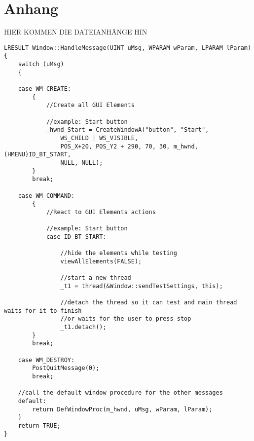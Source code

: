 

\chapter{Anhang}
HIER KOMMEN DIE DATEIANHÄNGE HIN



\begin{lstlisting}	
LRESULT Window::HandleMessage(UINT uMsg, WPARAM wParam, LPARAM lParam)
{
    switch (uMsg)
    {

    case WM_CREATE:
        {
            //Create all GUI Elements
            
            //example: Start button
            _hwnd_Start = CreateWindowA("button", "Start",
				WS_CHILD | WS_VISIBLE,
				POS_X+20, POS_Y2 + 290, 70, 30, m_hwnd, (HMENU)ID_BT_START,
				NULL, NULL);
        }
        break;
        
    case WM_COMMAND:
        {
            //React to GUI Elements actions
            
            //example: Start button
            case ID_BT_START:

				//hide the elements while testing
				viewAllElements(FALSE);

				//start a new thread
				_t1 = thread(&Window::sendTestSettings, this);
				
				//detach the thread so it can test and main thread waits for it to finish
				//or waits for the user to press stop
				_t1.detach();
        }
        break;
        
    case WM_DESTROY:
        PostQuitMessage(0);
        break;

	//call the default window procedure for the other messages
    default:
        return DefWindowProc(m_hwnd, uMsg, wParam, lParam);
    }
    return TRUE;
}

\end{lstlisting}

